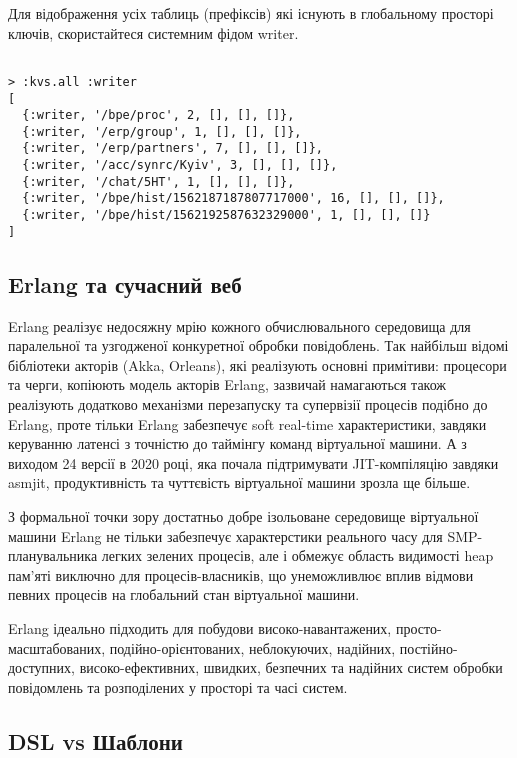 Для відображення усіх таблиць (префіксів) які існують в глобальному
просторі ключів, скористайтеся системним фідом writer.

\begin{lstlisting}

> :kvs.all :writer
[
  {:writer, '/bpe/proc', 2, [], [], []},
  {:writer, '/erp/group', 1, [], [], []},
  {:writer, '/erp/partners', 7, [], [], []},
  {:writer, '/acc/synrc/Kyiv', 3, [], [], []},
  {:writer, '/chat/5HT', 1, [], [], []},
  {:writer, '/bpe/hist/1562187187807717000', 16, [], [], []},
  {:writer, '/bpe/hist/1562192587632329000', 1, [], [], []}
]
\end{lstlisting}

\subsection{Erlang та сучасний веб}

Erlang реалізує недосяжну мрію кожного обчислювального середовища для
паралельної та узгодженої конкуретної обробки повідоблень. Так найбільш
відомі бібліотеки акторів (Akka, Orleans), які реалізують основні примітиви:
процесори та черги, копіюють модель акторів Erlang, зазвичай намагаються
також реалізують додатково механізми перезапуску та супервізії процесів
подібно до Erlang, проте тільки Erlang забезпечує soft real-time характеристики,
завдяки керуванню латенсі з точністю до таймінгу команд віртуальної машини.
А з виходом 24 версії в 2020 році, яка почала підтримувати JIT-компіляцію
завдяки asmjit, продуктивність та чуттєвість віртуальної машини зрозла
ще більше.

З формальної точки зору достатньо добре ізольоване середовище віртуальної
машини Erlang не тільки забезпечує характерстики реального часу для
SMP-планувальника легких зелених процесів, але і обмежує область видимості
heap пам'яті виключно для процесів-власників, що унеможливлює вплив відмови
певних процесів на глобальний стан віртуальної машини.

Erlang ідеально підходить для побудови високо-навантажених,
просто-масштабованих, подійно-орієнтованих, неблокуючих, надійних,
постійно-доступних, високо-ефективних, швидких, безпечних та надійних
систем обробки повідомлень та розподілених у просторі та часі систем.

\subsection{DSL vs Шаблони}

